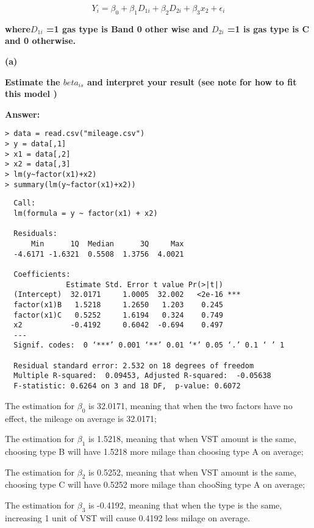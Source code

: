 \documentclass[letterpaper,11pt]{article}
\begin{document}
$$Y_i =\beta_0 +\beta_1D_{1i} +\beta_2D_{2i} +\beta_3x_2 + \epsilon_i$$

\begin{addmargin}[-1.1em]{0em} \textbf{
where$D_{1i}$ =1 gas type is Band 0 other wise and $D_{2i}$ =1 is gas type is
C and 0 otherwise.}\par\end{addmargin}


    \bigbreak
    \begin{addmargin}[-1.1em]{0em}
    \textbf{(a)}\par\end{addmargin}
      \textbf{Estimate the $beta_{is}$ and interpret your result (see note for how to fit this model )}\par
    \bigbreak

    \begin{addmargin}[-0.5em]{0em}
    \textbf{Answer:}\end{addmargin}

\begin{lstlisting}
> data = read.csv("mileage.csv")
> y = data[,1]
> x1 = data[,2]
> x2 = data[,3]
> lm(y~factor(x1)+x2)
> summary(lm(y~factor(x1)+x2))
\end{lstlisting}

\begin{lstlisting}
  Call:
  lm(formula = y ~ factor(x1) + x2)

  Residuals:
      Min      1Q  Median      3Q     Max
  -4.6171 -1.6321  0.5508  1.3756  4.0021

  Coefficients:
              Estimate Std. Error t value Pr(>|t|)
  (Intercept)  32.0171     1.0005  32.002   <2e-16 ***
  factor(x1)B   1.5218     1.2650   1.203    0.245
  factor(x1)C   0.5252     1.6194   0.324    0.749
  x2           -0.4192     0.6042  -0.694    0.497
  ---
  Signif. codes:  0 ‘***’ 0.001 ‘**’ 0.01 ‘*’ 0.05 ‘.’ 0.1 ‘ ’ 1

  Residual standard error: 2.532 on 18 degrees of freedom
  Multiple R-squared:  0.09453,	Adjusted R-squared:  -0.05638
  F-statistic: 0.6264 on 3 and 18 DF,  p-value: 0.6072
\end{lstlisting}
The estimation for $\beta_0$ is 32.0171, meaning that when the two factors have no effect, the mileage on average is 32.0171;\par
The estimation for $\beta_1$ is 1.5218, meaning that when VST amount is the same, choosing type B will have 1.5218 more milage than choosing type A on average;\par
The estimation for $\beta_2$ is 0.5252, meaning that when VST amount is the same, choosing type C will have 0.5252 more milage than chooSing type A on average;\par
The estimation for $\beta_3$ is -0.4192, meaning that when the type is the same, increasing 1 unit of VST will cause 0.4192 less milage on average.
\end{document}
